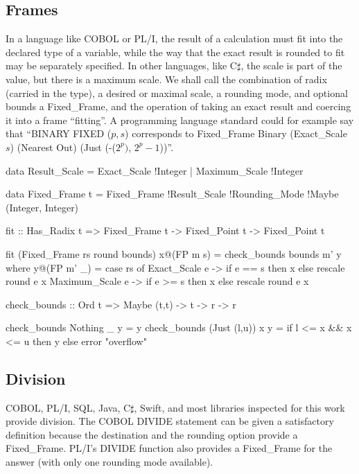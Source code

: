 \documentclass{article}
\begin{document}
\subsection{Frames}

In a language like COBOL or PL/I, the result of a calculation
must fit into the declared type of a variable, while the way
that the exact result is rounded to fit may be separately
specified.  In other languages, like C$\sharp$, the scale is
part of the value, but there is a maximum scale.  We shall
call the combination of radix (carried in the type),
a desired or maximal scale, a rounding
mode, and optional bounds a Fixed\_Frame, and the operation
of taking an exact result and coercing it into a frame ``fitting''.
A programming language standard could for example say that
``BINARY FIXED ($p,s$) corresponds to
Fixed\_Frame Binary (Exact\_Scale $s$) (Nearest Out)
(Just (-($2^p)$, $2^p-1$))''.

\begin{code}
data Result_Scale
   = Exact_Scale   !Integer
   | Maximum_Scale !Integer

data Fixed_Frame t
   = Fixed_Frame !Result_Scale !Rounding_Mode
                 !Maybe (Integer, Integer)

fit :: Has_Radix t =>
       Fixed_Frame t -> Fixed_Point t -> Fixed_Point t

fit (Fixed_Frame rs round bounds) x@(FP m s)
  = check_bounds bounds m' y
  where
    y@(FP m' _) =
      case rs of
        Exact_Scale e   -> if e == s then x else
                           rescale round e x
        Maximum_Scale e -> if e >= s then x else
                           rescale round e x

check_bounds :: Ord t => Maybe (t,t) -> t -> r -> r

check_bounds Nothing      _ y = y
check_bounds (Just (l,u)) x y =
  if l <= x && x <= u then y else error "overflow"

\end{code}

\subsection{Division}

COBOL, PL/I, SQL, Java, C$\sharp$, Swift, and most libraries
inspected for this work provide division.  The COBOL
DIVIDE statement can be given a satisfactory definition because
the destination and the rounding option provide a Fixed\_Frame.
PL/I's DIVIDE function also provides a Fixed\_Frame for the
answer (with only one rounding mode available).
\end{document}
